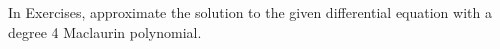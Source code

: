 \begin{exerciseset}{In Exercises}{, approximate the solution to the given differential equation with a degree 4 Maclaurin polynomial.}




\end{exerciseset}
